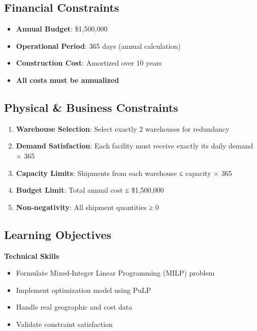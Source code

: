 \documentclass[
  letterpaper,
  DIV=11,
  numbers=noendperiod]{scrreprt}
\providecommand{\tightlist}{%
  \setlength{\itemsep}{0pt}\setlength{\parskip}{0pt}}
\begin{document}
\subsection{Financial Constraints}\label{financial-constraints}

\begin{itemize}
\tightlist
\item
  \textbf{Annual Budget}: \$1,500,000
\item
  \textbf{Operational Period}: 365 days (annual calculation)
\item
  \textbf{Construction Cost}: Amortized over 10 years
\item
  \textbf{All costs must be annualized}
\end{itemize}

\subsection{Physical \& Business
Constraints}\label{physical-business-constraints}

\begin{enumerate}
\def\labelenumi{\arabic{enumi}.}
\tightlist
\item
  \textbf{Warehouse Selection}: Select exactly 2 warehouses for
  redundancy
\item
  \textbf{Demand Satisfaction}: Each facility must receive exactly its
  daily demand × 365
\item
  \textbf{Capacity Limits}: Shipments from each warehouse ≤ capacity ×
  365
\item
  \textbf{Budget Limit}: Total annual cost ≤ \$1,500,000
\item
  \textbf{Non-negativity}: All shipment quantities ≥ 0
\end{enumerate}

\subsection{Learning Objectives}\label{learning-objectives-1}

\textbf{Technical Skills}

\begin{itemize}
\tightlist
\item
  Formulate Mixed-Integer Linear Programming (MILP) problem
\item
  Implement optimization model using PuLP
\item
  Handle real geographic and cost data
\item
  Validate constraint satisfaction
\end{itemize}
\end{document}
